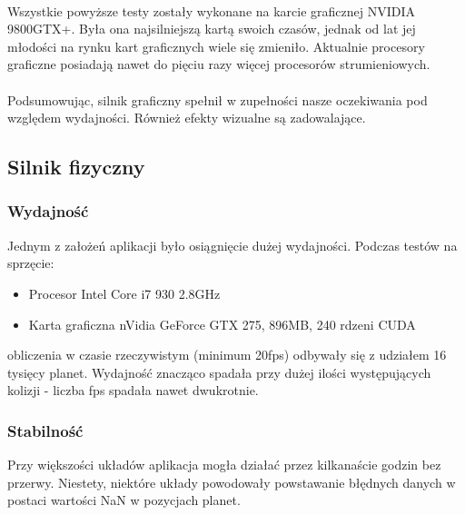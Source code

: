\paragraph{}

Wszystkie powyższe testy zostały wykonane na karcie graficznej NVIDIA 9800GTX+. Była ona najsilniejszą kartą swoich czasów, jednak od lat jej młodości na rynku kart graficznych wiele się zmieniło. Aktualnie procesory graficzne posiadają nawet do pięciu razy więcej procesorów strumieniowych.

\paragraph{}

Podsumowując, silnik graficzny spełnił w zupełności nasze oczekiwania pod względem wydajności. Również efekty wizualne są zadowalające.


\subsection{Silnik fizyczny}\label{sub:silnik fizyczny}
\subsubsection{Wydajność}
Jednym z założeń aplikacji było osiągnięcie dużej wydajności. Podczas testów na sprzęcie:
\begin{itemize}
\item{Procesor Intel Core i7 930 2.8GHz}
\item{Karta graficzna nVidia GeForce GTX 275, 896MB, 240 rdzeni CUDA}
\end{itemize}
obliczenia w czasie rzeczywistym (minimum 20fps) odbywały się z udziałem 16 tysięcy planet. Wydajność znacząco spadała przy dużej ilości występujących kolizji - liczba fps spadała nawet dwukrotnie.

\subsubsection{Stabilność}
Przy większości układów aplikacja mogła działać przez kilkanaście godzin bez przerwy. Niestety, niektóre układy powodowały powstawanie błędnych danych w postaci wartości NaN w pozycjach planet.
